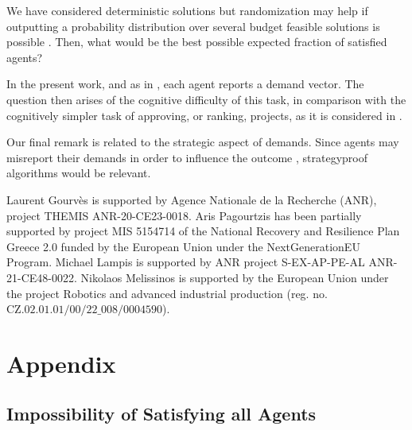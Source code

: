 \documentclass{article}
\begin{document}
\begin{comment}

The focus of this work is on four natural values of $\tau$, namely $\tau \in \{1,m/2,m-1,m\}$;  other values of $\tau$  
might also be of interest.    
\end{comment}

We have considered deterministic solutions but randomization may help if outputting a probability distribution over several budget feasible solutions is possible \cite{GoyalSSG23}. Then, what would be the best possible expected fraction of satisfied agents? 

In the present work, and as in  \cite{WagnerM23,EST23,CCP24,FS24}, each agent 
reports a demand vector. 
The question then arises of the cognitive difficulty of this task, 
in comparison with the cognitively simpler task of approving, or ranking,  projects, as it is considered in \cite{AACKLP23,MPS20,BGPSW24}.


Our final remark is related to the strategic aspect of demands. Since agents may misreport their demands in order to influence the outcome \cite{FPPV21}, 
strategyproof algorithms would be relevant. 








\bigskip

  Laurent Gourv{\`e}s is supported  by  Agence  Nationale  de  la  Recherche  (ANR),  project THEMIS ANR-20-CE23-0018. Aris Pagourtzis has been partially supported by project MIS 5154714 of the National Recovery and Resilience Plan Greece 2.0 funded by the European Union under the NextGenerationEU Program. Michael Lampis is supported by ANR project S-EX-AP-PE-AL ANR-21-CE48-0022.
Nikolaos Melissinos is supported by the European Union under the project Robotics and advanced industrial production (reg. no. $\text{CZ}.02.01.01/00/22\_008/0004590$).

 


\section{Appendix}

\subsection{Impossibility of Satisfying all Agents} \label{sec:sm:1}
\end{document}
